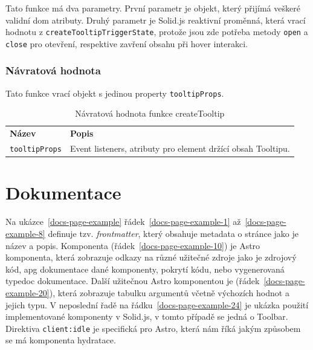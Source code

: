 Tato funkce má dva parametry.
První parametr je objekt, který přijímá veškeré validní \gls{dom} atributy.
Druhý parametr je Solid.js reaktivní proměnná, která vrací hodnotu z \texttt{createTooltipTriggerState}, protože jsou zde potřeba metody \texttt{open} a \texttt{close} pro otevření, respektive zavření obsahu při hover interakci.

\subsubsection{Návratová hodnota}

Tato funkce vrací objekt s jedinou property \texttt{tooltipProps}.

\begin{table}[ht]
    \begin{ctucolortab}
        \begin{tabularx}{\textwidth}{p{3cm} X}
            \bfseries Název       & \bfseries Popis                                              \\\Midrule{}
            \texttt{tooltipProps} & Event listeners, atributy pro element držící obsah Tooltipu.
        \end{tabularx}
    \end{ctucolortab}
    \caption{Návratová hodnota funkce createTooltip}
    \label{table:tooltip-return}
\end{table}

\clearpage

\section{Dokumentace}

Na ukázce~\ref{docs-page-example} řádek~\ref{docs-page-example-1} až~\ref{docs-page-example-8} definuje tzv. \textit{frontmatter}, který obsahuje metadata o stránce jako je název a popis.
Komponenta  (řádek~\ref{docs-page-example-10}) je Astro komponenta, která zobrazuje odkazy na různé užitečné zdroje jako je zdrojový kód, \gls{apg} dokumentace dané komponenty, pokrytí kódu, nebo vygenerovaná typedoc dokumentace.
Další užitečnou Astro komponentou je  (řádek~\ref{docs-page-example-20}), která zobrazuje tabulku argumentů včetně výchozích hodnot a jejich typu.
V neposlední řadě na řádku~\ref{docs-page-example-24} je ukázka použití implementované komponenty v Solid.js, v tomto případě se jedná o Toolbar.
Direktiva \texttt{client:idle} je specifická pro Astro, která nám říká jakým způsobem se má komponenta \gls{hydratace}.


